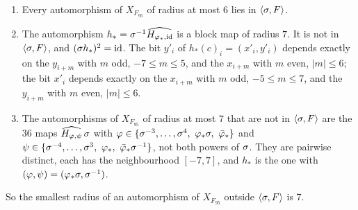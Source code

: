 \begin{proposition}\label{cl:prop:95small}
\leavevmode
\begin{enumerate}
\item[(a)] Every automorphism of $X_{F_{95}}$ of radius at most $6$ lies in $\langle\sigma,F\rangle$.
\item[(b)] The automorphism $h_{\ast}=\sigma^{-1}\widehat{H_{\varphi_{\ast},\mathrm{id}}}$ is a block map of radius $7$. It is not in $\langle\sigma,F\rangle$, and $(\sigma h_{\ast})^2=\mathrm{id}$. The bit $y'_i$ of $h_{\ast}(c)_i=(x'_i,y'_i)$ depends exactly on the $y_{i+m}$ with $m$ odd, $-7\le m\le5$, and the $x_{i+m}$ with $m$ even, $|m|\le6$; the bit $x'_i$ depends exactly on the $x_{i+m}$ with $m$ odd, $-5\le m\le7$, and the $y_{i+m}$ with $m$ even, $|m|\le6$.
\item[(c)] The automorphisms of $X_{F_{95}}$ of radius at most $7$ that are not in $\langle\sigma,F\rangle$ are the $36$ maps $\widehat{H_{\varphi,\psi}}\,\sigma$ with $\varphi\in\{\sh^{-3},\dots,\sh^{4},\ \varphi_{\ast}\sh,\ \bar\varphi_{\ast}\}$ and $\psi\in\{\sh^{-4},\dots,\sh^{3},\ \varphi_{\ast},\ \bar\varphi_{\ast}\sh^{-1}\}$, not both powers of $\sigma$. They are pairwise distinct, each has the neighbourhood $[-7,7]$, and $h_{\ast}$ is the one with $(\varphi,\psi)=(\varphi_{\ast}\sigma,\sigma^{-1})$.
\end{enumerate}
So the smallest radius of an automorphism of $X_{F_{95}}$ outside $\langle\sigma,F\rangle$ is $7$.
\end{proposition}

